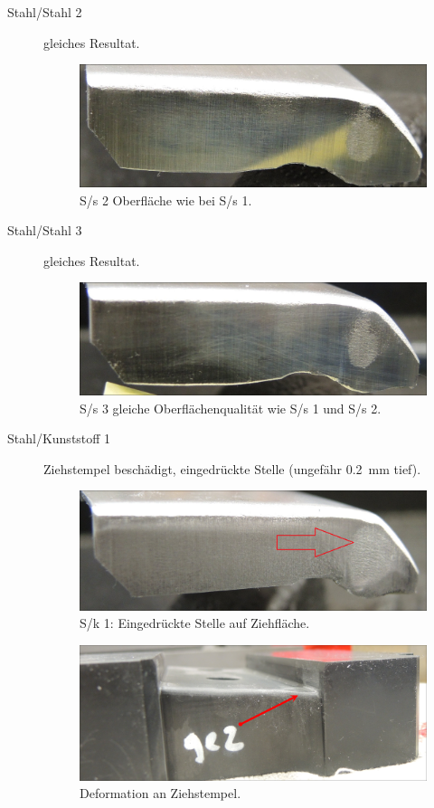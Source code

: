 \documentclass[12pt,a4paper,parskip,twoside,BCOR5mm,headsepline]{scrartcl}
\begin{document}
\begin{description*}
\begin{description}
\item[Stahl/Stahl 2]gleiches Resultat.
\begin{figure}[H]
\centering
\includegraphics[width=.8\textwidth]{Ss2}
\caption{S/s 2 Oberfläche wie bei S/s 1.}
\label{fig:ss2}
\end{figure}
\item[Stahl/Stahl 3] gleiches Resultat.
\begin{figure}[H]
\centering
\includegraphics[width=.8\textwidth]{Ss3}
\caption{S/s 3 gleiche Oberflächenqualität wie S/s 1 und S/s 2.}
\label{fig:ss3}
\end{figure}
\item[Stahl/Kunststoff 1] Ziehstempel beschädigt, eingedrückte Stelle (ungefähr \SI{0.2}{\milli\meter} tief).
\begin{figure}[H]
\centering
\includegraphics[width=.8\textwidth]{Sk1}
\caption{S/k 1: Eingedrückte Stelle auf Ziehfläche.}
\label{fig:sk1}
\end{figure}
\begin{figure}[H]
\centering
\includegraphics[width=.8\textwidth]{PunchDefektGut}
\caption{Deformation an Ziehstempel.}
\label{fig:punchdefect}
\end{figure}


\end{description}
\end{description*}
\end{document}
